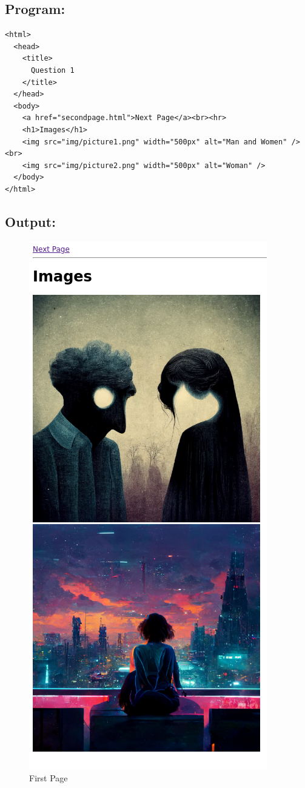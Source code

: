 \documentclass[12pt, a4paper]{article}
\begin{document}
\subsection*{Program:}
\begin{lstlisting}
<html>
  <head>
    <title>
      Question 1
    </title>
  </head>
  <body>
    <a href="secondpage.html">Next Page</a><br><hr>
    <h1>Images</h1>
    <img src="img/picture1.png" width="500px" alt="Man and Women" /><br>
    <img src="img/picture2.png" width="500px" alt="Woman" />
  </body>
</html>
\end{lstlisting}
\newpage
\subsection*{Output:}
\begin{figure}[h]
  \centering
  \includegraphics[height=0.45\textheight]{1}
  \caption{First Page}
\end{figure}
\end{document}
